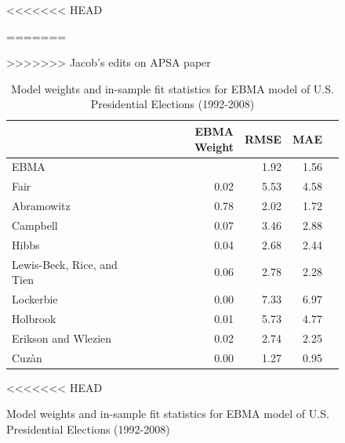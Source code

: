 \documentclass[12pt,fullpage,endnotes]{article}
\begin{document}
\begin{figure}[h]
\begin{table}[ht]
<<<<<<< HEAD
\caption{Presidential Election Forecast: Model weights and calibration period fit statistics.}
=======
\caption{Model weights and in-sample fit statistics for EBMA model of U.S. Presidential Elections (1992-2008)}
>>>>>>> Jacob's edits on APSA paper
\label{presModel}
\begin{center}
\begin{tabular}{lrrrr}
  \toprule
 & EBMA Weight &RMSE &MAE \\ 
  \midrule
EBMA &  & 1.92 & 1.56 \\ 
  Fair & 0.02 & 5.53 & 4.58 \\ 
  Abramowitz & 0.78 & 2.02 & 1.72 \\ 
  Campbell  & 0.07 & 3.46 & 2.88 \\ 
  Hibbs  & 0.04 & 2.68 & 2.44 \\ 
  Lewis-Beck, Rice, and Tien & 0.06 & 2.78 & 2.28 \\ 
  Lockerbie  & 0.00 & 7.33 & 6.97 \\ 
 Holbrook & 0.01 & 5.73 & 4.77 \\ 
  Erikson and Wlezien & 0.02 & 2.74 & 2.25 \\ 
  Cuz\`an & 0.00 & 1.27 & 0.95 \\ 
   \bottomrule
\end{tabular}
\end{center}
\end{table}

<<<<<<< HEAD



\end{figure}
\end{document}
